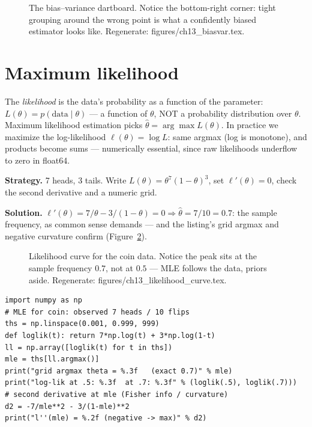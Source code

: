 \begin{figure}[htbp]
\centering

\caption{The bias--variance dartboard. Notice the bottom-right corner:
tight grouping around the wrong point is what a confidently biased
estimator looks like. Regenerate: \ttfamily figures/ch13\_biasvar.tex.}
\label{fig:biasvar}
\end{figure}

\section{Maximum likelihood}\label{sec:stats-mle}

The \emph{likelihood} is the data's probability as a
function of the parameter: $L(\theta)=p(\text{data}\mid\theta)$ ---
a function of $\theta$, NOT a probability distribution over $\theta$.
Maximum likelihood estimation picks
$\hat\theta=\arg\max L(\theta)$. In practice we maximize the
log-likelihood $\ell(\theta)=\log L$: same argmax (log is monotone),
and products become sums --- numerically essential, since raw likelihoods
underflow to zero in float64.

\begin{example}\label{ex:mlecoin}
\textbf{Strategy.} 7 heads, 3 tails. Write $L(\theta)=\theta^{7}(1-\theta)^{3}$,
set $\ell'(\theta)=0$, check the second derivative and a numeric grid.

\textbf{Solution.} $\ell'(\theta)=7/\theta-3/(1-\theta)=0\Rightarrow
\hat\theta=7/10=0.7$: the sample frequency, as common sense demands ---
and the listing's grid argmax and negative curvature confirm
(Figure~\ref{fig:likcurve}).
\end{example}

\begin{figure}[htbp]
\centering

\caption{Likelihood curve for the coin data. Notice the peak sits at the
sample frequency $0.7$, not at $0.5$ --- MLE follows the data, priors
aside. Regenerate: \ttfamily figures/ch13\_likelihood\_curve.tex.}
\label{fig:likcurve}
\end{figure}

\begin{lstlisting}[caption={\ttfamily code/ch13\_mle\_coin.py --- the
coin MLE located numerically and curvature-checked.}]
import numpy as np
# MLE for coin: observed 7 heads / 10 flips
ths = np.linspace(0.001, 0.999, 999)
def loglik(t): return 7*np.log(t) + 3*np.log(1-t)
ll = np.array([loglik(t) for t in ths])
mle = ths[ll.argmax()]
print("grid argmax theta = %.3f   (exact 0.7)" % mle)
print("log-lik at .5: %.3f  at .7: %.3f" % (loglik(.5), loglik(.7)))
# second derivative at mle (Fisher info / curvature)
d2 = -7/mle**2 - 3/(1-mle)**2
print("l''(mle) = %.2f (negative -> max)" % d2)
\end{lstlisting}

